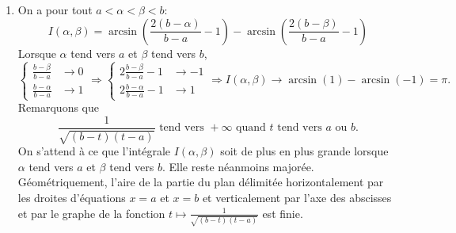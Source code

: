 \begin{enumerate}
\begin{enumerate}
\item On a pour tout $a<\alpha < \beta < b$:
\begin{displaymath}
I(\alpha, \beta ) = \arcsin \left ( \frac{2(b-\alpha)}{b-a}-1\right ) - \arcsin \left ( \frac{2(b-\beta)}{b-a}-1  \right)  
\end{displaymath}
Lorsque $\alpha$ tend vers $a$ et $\beta$ tend vers $b$, 
\begin{displaymath}
\left\lbrace  
\begin{aligned}
  \frac{b-\beta}{b-a} &\rightarrow 0 \\ \frac{b-\alpha}{b-a} &\rightarrow 1
\end{aligned}
\right. \Rightarrow
\left\lbrace  
\begin{aligned}
  2\frac{b-\beta}{b-a}-1 &\rightarrow -1 \\ 2\frac{b-\alpha}{b-a}-1 &\rightarrow 1
\end{aligned}
\right. \Rightarrow I(\alpha, \beta) \rightarrow \arcsin (1)-\arcsin (-1) = \pi. 
\end{displaymath}
Remarquons que 
\begin{displaymath}
 \frac{1}{\sqrt{(b - t)(t-a)}}\text{ tend vers } +\infty \text{ quand $t$ tend vers $a$ ou $b$.} 
\end{displaymath}
On s'attend à ce que l'intégrale $I(\alpha, \beta)$ soit de plus en plus grande lorsque $\alpha$ tend vers $a$ et $\beta$ tend vers $b$. Elle reste néanmoins majorée. \\
Géométriquement, l'aire de la partie du plan délimitée horizontalement par les droites d'équations $x=a$ et $x=b$ et verticalement par l'axe des abscisses et par le 
graphe de la fonction $t\mapsto \frac{1}{\sqrt{(b - t)(t-a)}}$ est finie. 
\end{enumerate}
\end{enumerate}



